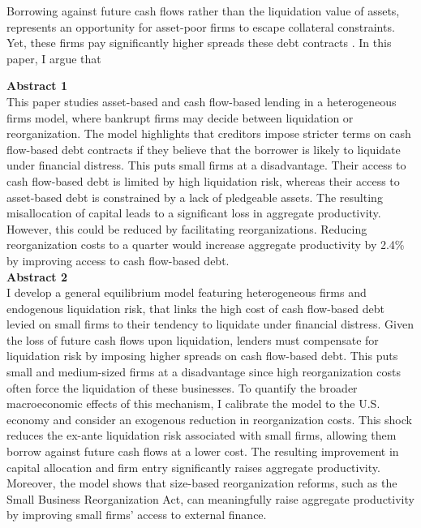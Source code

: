 \documentclass[12pt]{article}
\begin{document}
 Borrowing against future cash flows rather than the liquidation value of assets, represents an opportunity for asset-poor firms to escape collateral constraints. Yet, these firms pay significantly higher spreads these debt contracts . In this paper, I argue that  

\newpage

\noindent \textbf{Abstract 1} \\
This paper studies asset-based and cash flow-based lending in a heterogeneous firms model, where bankrupt firms may decide between liquidation or reorganization. The model highlights that creditors impose stricter terms on cash flow-based debt contracts if they believe that the borrower is likely to liquidate under financial distress. This puts small firms at a disadvantage. Their access to cash flow-based debt is limited by high liquidation risk, whereas their access to asset-based debt is constrained by a lack of pledgeable assets. The resulting misallocation of capital leads to a significant loss in aggregate productivity. However, this could be reduced by facilitating reorganizations. Reducing reorganization costs to a quarter would increase aggregate productivity by 2.4\% by improving access to cash flow-based debt. \vspace{3mm} \\
\textbf{Abstract 2} \\
I develop a general equilibrium model featuring heterogeneous firms and endogenous liquidation risk, that links the high cost of cash flow-based debt levied on small firms to their tendency to liquidate under financial distress. Given the loss of future cash flows upon liquidation, lenders must compensate for liquidation risk by imposing higher spreads on cash flow-based debt. This puts small and medium-sized firms at a disadvantage since high reorganization costs often force the liquidation of these businesses. To quantify the broader
macroeconomic effects of this mechanism, I calibrate the model to the U.S. economy and consider an exogenous reduction in reorganization costs. This shock reduces the ex-ante liquidation risk associated with small firms, allowing them borrow against future cash flows at a lower cost. The resulting improvement in capital allocation and firm entry significantly raises aggregate productivity. Moreover, the model shows that size-based reorganization reforms, such as the Small Business Reorganization Act, can meaningfully raise aggregate productivity by improving small firms’ access to external finance. \vspace{3mm} \\
\end{document}
